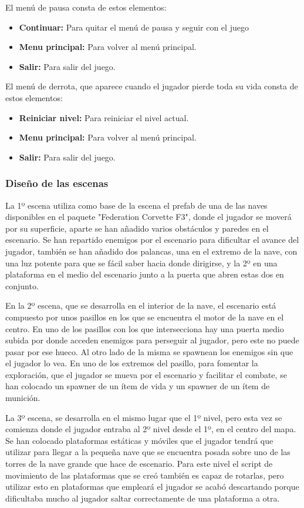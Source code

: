 El menú de pausa consta de estos elementos:
\begin{itemize}
	\item \textbf{Continuar:} Para quitar el menú de pausa y seguir con el juego
	\item \textbf{Menu principal:} Para volver al menú principal.
	\item \textbf{Salir:} Para salir del juego.
\end{itemize}
El menú de derrota, que aparece cuando el jugador pierde toda su vida consta de estos elementos:
\begin{itemize}
	\item \textbf{Reiniciar nivel:} Para reiniciar el nivel actual.
	\item \textbf{Menu principal:} Para volver al menú principal.
	\item \textbf{Salir:} Para salir del juego.
\end{itemize}

\subsubsection{Diseño de las escenas}
La 1º escena utiliza como base de la escena el prefab de una de las naves disponibles en el paquete "Federation Corvette F3", donde el jugador se moverá por su superficie, aparte se han añadido varios obstáculos y paredes en el escenario. Se han repartido enemigos por el escenario para dificultar el avance del jugador, también se han añadido dos palancas, una en el extremo de la nave, con una luz potente para que se fácil saber hacia donde dirigirse, y la 2º en una plataforma en el medio del escenario junto a la puerta que abren estas dos en conjunto.

En la 2º escena, que se desarrolla en el interior de la nave, el escenario está compuesto por unos pasillos en los que se encuentra el motor de la nave en el centro. En uno de los pasillos con los que intersecciona hay una puerta medio subida por donde acceden enemigos para perseguir al jugador, pero este no puede pasar por ese hueco. Al otro lado de la misma se spawnean los enemigos sin que el jugador lo vea. En uno de los extremos del pasillo, para fomentar la exploración, que el jugador se mueva por el escenario y facilitar el combate, se han colocado un spawner de un ítem de vida y un spawner de un ítem de munición.

La 3º escena, se desarrolla en el mismo lugar que el 1º nivel, pero esta vez se comienza donde el jugador entraba al 2º nivel desde el 1º, en el centro del mapa. Se han colocado plataformas estáticas y móviles que el jugador tendrá que utilizar para llegar a la pequeña nave que se encuentra posada sobre uno de las torres de la nave grande que hace de escenario. Para este nivel el script de movimiento de las plataformas que se creó también es capaz de rotarlas, pero utilizar esto en plataformas que empleará el jugador se acabó descartando porque dificultaba mucho al jugador saltar correctamente de una plataforma a otra.

